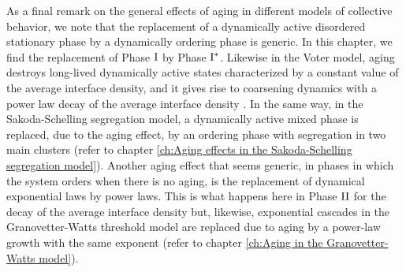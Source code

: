 As a final remark on the general effects of aging in different models of collective behavior, we note that the replacement of a dynamically active disordered stationary phase by a dynamically ordering phase is generic. In this chapter, we find the replacement of Phase ${\rm I}$ by Phase ${\rm I}^{*}$. Likewise in the Voter model, aging destroys long-lived dynamically active states characterized by a constant value of the average interface density, and it gives rise to coarsening dynamics with a power law decay of the average interface density \cite{fernandez-gracia-2011}. In the same way, in the Sakoda-Schelling segregation model, a dynamically active mixed phase is replaced, due to the aging effect, by an ordering phase with segregation in two main clusters (refer to chapter \ref{ch:Aging effects in the Sakoda-Schelling segregation model}). 
Another aging effect that seems generic, in phases in which the system orders when there is no aging, is the replacement of dynamical exponential laws by power laws. This is what happens here in  Phase ${\rm II}$ for the decay of the average interface density but, likewise, exponential cascades in the Granovetter-Watts threshold model are replaced due to aging by a power-law growth with the same exponent (refer to chapter \ref{ch:Aging in the Granovetter-Watts model}).
